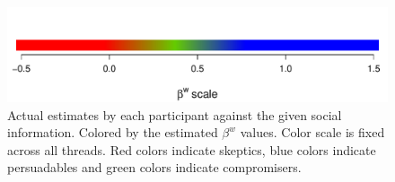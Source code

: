 \documentclass[9pt,a4paper,twocolumn,lineno]{article}
\begin{document}
\begin{figure}
	\includegraphics[width=.5\linewidth]{betascale_horizontal}

	\caption{Actual estimates by each participant against the given social information. Colored by the estimated $\beta^w$ values. Color scale is fixed across all threads. Red colors indicate skeptics, blue colors indicate persuadables and green colors indicate compromisers.}\label{fig: social info vs estimates}
\end{figure}


\end{document}
